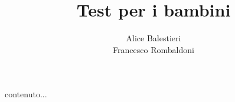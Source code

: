 \documentclass[hidelinks,12pt,a4paper]{exam}
\begin{document}
	\title{\textbf{Test per i bambini}}
	\author{Alice Balestieri\\Francesco Rombaldoni}
	\date{}
	\maketitle
	
	\newpage
	
	\begin{minipage}
		contenuto...
	\end{minipage}
\end{document}
